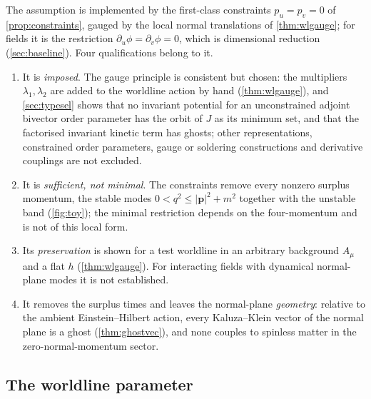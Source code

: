 The assumption is implemented by the first-class constraints $p_u=p_v=0$ of \cref{prop:constraints}, gauged by the local normal translations of
\cref{thm:wlgauge}; for fields it is the restriction $\partial_u\phi=\partial_v\phi=0$, which is dimensional reduction (\cref{sec:baseline}). Four
qualifications belong to it.
\begin{enumerate}[label=(\roman*),leftmargin=2.2em]
\item It is \emph{imposed}. The gauge principle is consistent but chosen: the multipliers $\lambda_1,\lambda_2$ are added to the worldline action by hand
(\cref{thm:wlgauge}), and \cref{sec:typesel} shows that no invariant potential for an unconstrained adjoint bivector order parameter has
the orbit of $J$ as its minimum set, and that the factorised invariant kinetic term has ghosts; other representations, constrained order
parameters, gauge or soldering constructions and derivative couplings are not excluded.
\item It is \emph{sufficient, not minimal}. The constraints remove every nonzero surplus momentum, the stable modes $0<q^2\le|\mathbf p|^2+m^2$
together with the unstable band (\cref{fig:toy}); the minimal restriction depends on the four-momentum and is not of this local form.
\item Its \emph{preservation} is shown for a test worldline in an arbitrary background $A_\mu$ and a flat $h$ (\cref{thm:wlgauge}). For
interacting fields with dynamical normal-plane modes it is not established.
\item It removes the surplus times and leaves the normal-plane \emph{geometry}: relative to the ambient Einstein--Hilbert action, every Kaluza--Klein
vector of the normal plane is a ghost (\cref{thm:ghostvec}), and none couples to spinless matter in the zero-normal-momentum sector.
\end{enumerate}

\subsection{The worldline parameter}

